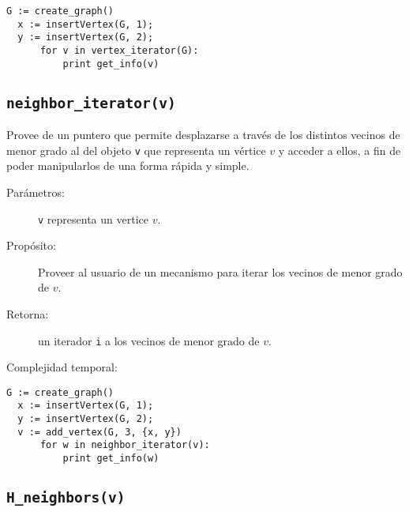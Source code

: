 \documentclass[a4paper,12pt]{article}
\makeatletter
\newcommand{\Code}[1]{\lstinline[basicstyle={\tt}]@#1@}
\makeatother
\begin{document}
\begin{lstlisting}[caption={Ejemplo de uso de vertex\_iterator. El código crea un grafo $G$ con el vertice 1 y el vertice 2. Luego, mediante el iterador de $G$ se recorre sus vertices y el ciclo imprime ``12''.},gobble=2,float=ht,label={lst:pseudo:vertex_iterator},emph={vertex_iterator}]
  G := create_graph()
  x := insertVertex(G, 1);
  y := insertVertex(G, 2);
      for v in vertex_iterator(G):
          print get_info(v)
\end{lstlisting}


\subsection{\Code{neighbor_iterator(v)}}%
\label{sec:tad grafo:neighbor-iterator}

Provee de un puntero que permite desplazarse a través de los distintos vecinos de menor grado al del objeto \texttt{v} que representa un vértice $v$ y acceder a ellos, a fin de poder manipularlos de una forma rápida y simple.

\begin{description}
  \item [Parámetros:] \Code{v} representa un vertice $v$.
  \item [Propósito:] Proveer al usuario de un mecanismo para iterar los vecinos de menor grado de $v$.
  \item [Retorna:] un iterador \Code{i} a los vecinos de menor grado de $v$.
  \item [Complejidad temporal:]
\end{description}


\begin{lstlisting}[caption={Ejemplo de uso de neighbor\_iterator. El código crea un grafo $G$ con el vertice 1, el vertice 2 y el vertice 3. Luego, mediante el iterador de $v$ se recorre sus vecinos de menor grado y el ciclo imprime ``12''.},gobble=2,float=ht,label={lst:pseudo:neighbor_iterator},emph={neighbor_iterator}]
  G := create_graph()
  x := insertVertex(G, 1);
  y := insertVertex(G, 2);
  v := add_vertex(G, 3, {x, y})
      for w in neighbor_iterator(v):
          print get_info(w)
\end{lstlisting}


\subsection{\Code{H_neighbors(v)}}%
\label{sec:tad grafo:H-neighbors}
\end{document}
